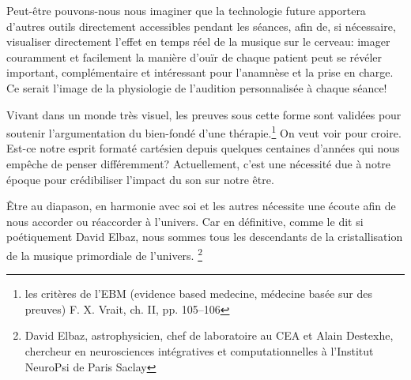 Peut-être pouvons-nous nous imaginer que la technologie future apportera d'autres outils
directement accessibles pendant les séances, afin
 de, si nécessaire, visualiser directement l'effet en temps réel de la musique sur le
 cerveau:  imager couramment et facilement la manière d'ouïr de chaque
 patient peut se révéler important, complémentaire et intéressant pour
 l'anamnèse et la prise en charge. Ce serait l'image de la
 physiologie de l'audition personnalisée à chaque séance!

 
Vivant dans un monde très visuel, les preuves sous cette forme sont
validées pour soutenir l'argumentation du bien-fondé d'une thérapie.\footnote{
	les critères de l'EBM (evidence based medecine, médecine basée sur des 
        preuves) F. X. Vrait, ch. II, pp. 105--106 }
On veut voir pour croire. Est-ce 
notre esprit formaté cartésien depuis quelques centaines d'années qui nous 
empêche de penser différemment? 
Actuellement, c'est une nécessité due à notre époque pour crédibiliser l'impact 
du son sur notre être.




Être au diapason, en harmonie avec soi et les autres
nécessite une écoute afin de nous accorder ou réaccorder à l'univers.
Car en définitive, comme le dit si poétiquement David Elbaz, nous sommes tous les
descendants de la cristallisation de la musique primordiale de
l'univers. \autocite{delbaz_recherche_2016} \footnote{David Elbaz, astrophysicien, chef de laboratoire au CEA et Alain
Destexhe, chercheur en neurosciences intégratives et computationnelles
à l'Institut  NeuroPsi de Paris Saclay} 


